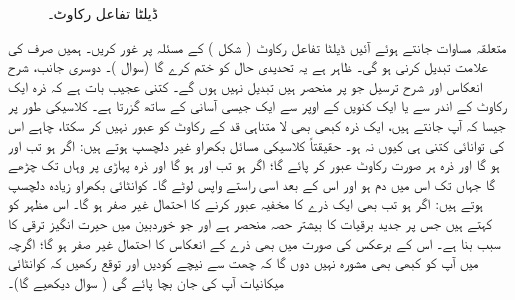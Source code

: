  \begin{figure}
\centering
{}
\caption{ڈیلٹا تفاعل رکاوٹ۔}
\label{شکل_غیر_تابع_ڈیلٹا_تفاعل_رکاوٹ}
\end{figure}
متعلقہ مساوات جانتے ہوئے آئیں ڈیلٹا تفاعل رکاوٹ ( شکل ) کے مسئلہ پر غور کریں۔ ہمیں صرف  کی علامت تبدیل کرنی ہو گی۔ ظاہر ہے یہ تحدیدی حال کو ختم کرے گا (سوال )۔ دوسری جانب، شرح انعکاس اور شرح ترسیل جو  پر منحصر ہیں تبدیل نہیں ہوں گے۔ کتنی عجیب بات ہے کہ  ذرہ ایک رکاوٹ کے اندر سے یا ایک کنویں  کے اوپر سے ایک جیسی آسانی کے ساتھ گزرتا ہے۔ کلاسیکی طور پر جیسا کہ آپ جانتے ہیں، ایک ذرہ کبھی بھی لا متناہی قد کے رکاوٹ کو عبور نہیں کر سکتا، چاہے اس کی توانائی کتنی ہی کیوں نہ ہو۔ حقیقتاً کلاسیکی مسائل بکھراو غیر دلچسپ ہوتے ہیں: اگر  ہو تب  اور  ہو گا اور ذرہ ہر صورت رکاوٹ عبور کر پائے گا؛ اگر  ہو تب  اور  ہو گا اور ذرہ پہاڑی پر وہاں تک چڑھے گا جہاں تک اس میں دم ہو اور اس کے بعد اسی راستے واپس لوٹے گا۔ کوانٹائی بکھراو زیادہ دلچسپ ہوتے ہیں: اگر  ہو تب بھی ایک ذرے کا مخفیہ عبور کرنے کا احتمال غیر صفر ہو گا۔ اس مظہر کو  کہتے ہیں جس پر جدید برقیات کا بیشتر حصہ منحصر ہے اور جو خوردبین میں حیرت انگیز ترقی کا سبب بنا ہے۔ اس کے برعکس  کی صورت میں بھی ذرے کے انعکاس کا احتمال غیر صفر ہو گا؛ اگرچہ میں آپ کو کبھی بھی مشورہ نہیں دوں گا کہ چھت سے نیچے کودیں اور توقع رکھیں کہ کوانٹائی میکانیات آپ کی جان بچا پائے گی ( سوال  دیکھیے گا)۔
 
